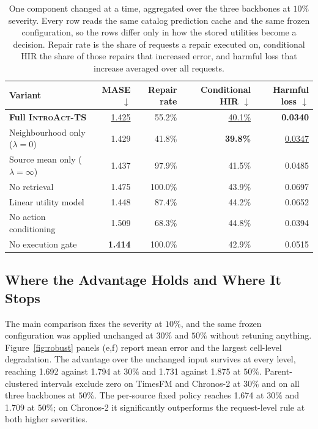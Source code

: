\documentclass{article}
\newcommand{\best}[1]{\textbf{#1}}
\newcommand{\second}[1]{\underline{#1}}
\newcommand{\introact}{\textsc{IntroAct-TS}}
\begin{document}
\begin{table}[t]
  \caption{One component changed at a time, aggregated over the three backbones at $10\%$
  severity. Every row reads the same catalog prediction cache and the same frozen
  configuration, so the rows differ only in how the stored utilities become a decision. Repair
  rate is the share of requests a repair executed on, conditional HIR the share of those
  repairs that increased error, and harmful loss that increase averaged over all requests.}
  \label{tab:ablation}
  \centering
  \small
  \setlength{\tabcolsep}{4pt}
\begin{tabularx}{\textwidth}{@{}Xrrrr@{}}
    \toprule
    Variant & MASE $\downarrow$ & Repair rate & Conditional HIR $\downarrow$ & Harmful loss $\downarrow$ \\
    \midrule
    \rowcolor{bestgray}\textbf{Full \introact{}} & \second{1.425} & 55.2\% & \second{40.1\%} & \best{0.0340} \\
    \midrule
    Neighbourhood only ($\lambda=0$) & 1.429 & 41.8\% & \best{39.8\%} & \second{0.0347} \\
    Source mean only ($\lambda=\infty$) & 1.437 & 97.9\% & 41.5\% & 0.0485 \\
    No retrieval & 1.475 & 100.0\% & 43.9\% & 0.0697 \\
    Linear utility model & 1.448 & 87.4\% & 44.2\% & 0.0652 \\
    No action conditioning & 1.509 & 68.3\% & 44.8\% & 0.0394 \\
    \midrule
    No execution gate & \best{1.414} & 100.0\% & 42.9\% & 0.0515 \\
    \bottomrule
  \end{tabularx}
\end{table}

\subsection{Where the Advantage Holds and Where It Stops}
\label{sec:exp-robust}
The main comparison fixes the severity at $10\%$, and the same frozen configuration was
applied unchanged at $30\%$ and $50\%$ without retuning anything. Figure~\ref{fig:robust}
panels (e,f) report mean error and the largest cell-level degradation. The advantage over the unchanged input survives at every level, reaching
1.692 against 1.794 at $30\%$ and 1.731 against 1.875 at $50\%$. Parent-clustered intervals
exclude zero on TimesFM and Chronos-2 at $30\%$ and on all three backbones at $50\%$. The
per-source fixed policy reaches 1.674 at $30\%$ and 1.709 at $50\%$; on Chronos-2 it
significantly outperforms the request-level rule at both higher severities.
\end{document}
